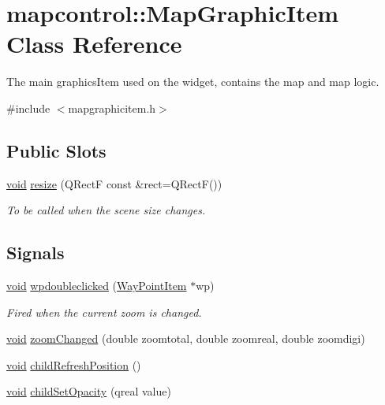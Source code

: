 \hypertarget{classmapcontrol_1_1_map_graphic_item}{\section{mapcontrol\-:\-:\-Map\-Graphic\-Item \-Class \-Reference}
\label{classmapcontrol_1_1_map_graphic_item}
}


\-The main graphics\-Item used on the widget, contains the map and map logic.  




{\ttfamily \#include $<$mapgraphicitem.\-h$>$}

\subsection*{\-Public \-Slots}
\begin{DoxyCompactItemize}
\item 
\hyperlink{group___u_a_v_objects_plugin_ga444cf2ff3f0ecbe028adce838d373f5c}{void} \hyperlink{group___o_p_map_widget_ga717dc7dc9953d7242b9f0db9d2e3951e}{resize} (\-Q\-Rect\-F const \&rect=\-Q\-Rect\-F())
\begin{DoxyCompactList}\small\item\em \-To be called when the scene size changes. \end{DoxyCompactList}\end{DoxyCompactItemize}
\subsection*{\-Signals}
\begin{DoxyCompactItemize}
\item 
\hyperlink{group___u_a_v_objects_plugin_ga444cf2ff3f0ecbe028adce838d373f5c}{void} \hyperlink{group___o_p_map_widget_ga795f053b52b5fe955eee059db5cb0afd}{wpdoubleclicked} (\hyperlink{classmapcontrol_1_1_way_point_item}{\-Way\-Point\-Item} $\ast$wp)
\begin{DoxyCompactList}\small\item\em \-Fired when the current zoom is changed. \end{DoxyCompactList}\item 
\hyperlink{group___u_a_v_objects_plugin_ga444cf2ff3f0ecbe028adce838d373f5c}{void} \hyperlink{group___o_p_map_widget_ga7022afbf8533ece279e5b06dcbe66935}{zoom\-Changed} (double zoomtotal, double zoomreal, double zoomdigi)
\item 
\hyperlink{group___u_a_v_objects_plugin_ga444cf2ff3f0ecbe028adce838d373f5c}{void} \hyperlink{group___o_p_map_widget_ga4877137ff20f1713d86737fcde3e5eef}{child\-Refresh\-Position} ()
\item 
\hyperlink{group___u_a_v_objects_plugin_ga444cf2ff3f0ecbe028adce838d373f5c}{void} \hyperlink{group___o_p_map_widget_ga2e3c45d4bbf9d439e3e6bb83d138c340}{child\-Set\-Opacity} (qreal value)
\end{DoxyCompactItemize}

